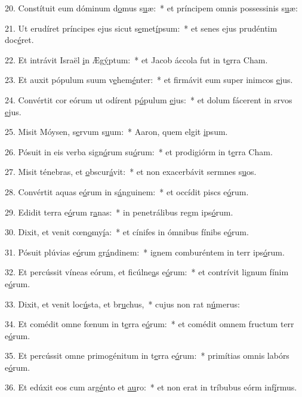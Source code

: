 20. Constítuit eum dóminum d\uline{o}mus s\uline{u}æ:~* et príncipem omnis possessinis s\uline{u}æ:\par 
21. Ut erudíret príncipes ejus sicut s\uline{e}met\uline{í}psum:~* et senes ejus prudéntim doc\uline{é}ret.\par 
22. Et intrávit Israël \uline{i}n Æg\uline{ý}ptum:~* et Jacob áccola fut in t\uline{e}rra Cham.\par 
23. Et auxit pópulum suum v\uline{e}hem\uline{é}nter:~* et firmávit eum super inimcos \uline{e}jus.\par 
24. Convértit cor eórum ut odírent p\uline{ó}pulum \uline{e}jus:~* et dolum fácerent in srvos \uline{e}jus.\par 
25. Misit Móysen, s\uline{e}rvum s\uline{u}um:~* Aaron, quem elgit \uline{i}psum.\par 
26. Pósuit in eis verba sign\uline{ó}rum su\uline{ó}rum:~* et prodigiórm in t\uline{e}rra Cham.\par 
27. Misit ténebras, et \uline{o}bscur\uline{á}vit:~* et non exacerbávit sermnes s\uline{u}os.\par 
28. Convértit aquas e\uline{ó}rum in s\uline{á}nguinem:~* et occídit piscs e\uline{ó}rum.\par 
29. Edidit terra e\uline{ó}rum r\uline{a}nas:~* in penetrálibus regm ips\uline{ó}rum.\par 
30. Dixit, et venit cœn\uline{o}my\uline{í}a:~* et cínifes in ómnibus fínibs e\uline{ó}rum.\par 
31. Pósuit plúvias e\uline{ó}rum gr\uline{á}ndinem:~* ignem comburéntem in terr ips\uline{ó}rum.\par 
32. Et percússit víneas eórum, et ficúlne\uline{a}s e\uline{ó}rum:~* et contrívit lignum fínim e\uline{ó}rum.\par 
33. Dixit, et venit loc\uline{ú}sta, et br\uline{u}chus,~* cujus non rat n\uline{ú}merus:\par 
34. Et comédit omne fœnum in t\uline{e}rra e\uline{ó}rum:~* et comédit omnem fructum terr e\uline{ó}rum.\par 
35. Et percússit omne primogénitum in t\uline{e}rra e\uline{ó}rum:~* primítias omnis labórs e\uline{ó}rum.\par 
36. Et edúxit eos cum arg\uline{é}nto et \uline{au}ro:~* et non erat in tríbubus eórm inf\uline{í}rmus.\par 

